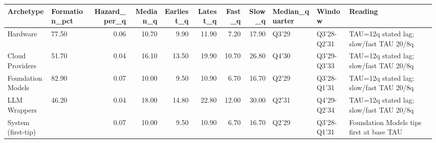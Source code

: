\begin{tabular}{llrrrrrrlll}
\toprule
Archetype & Formation_pct & Hazard_per_q & Median_q & Earliest_q & Latest_q & Fast_q & Slow_q & Median_quarter & Window & Reading \\
\midrule
Hardware & 77.50 & 0.06 & 10.70 & 9.90 & 11.90 & 7.20 & 17.90 & Q3'29 & Q3'28-Q2'31 & TAU=12q stated lag; slow/fast TAU 20/8q \\
Cloud Providers & 51.70 & 0.04 & 16.10 & 13.50 & 19.90 & 10.70 & 26.80 & Q4'30 & Q3'29-Q3'33 & TAU=12q stated lag; slow/fast TAU 20/8q \\
Foundation Models & 82.90 & 0.07 & 10.00 & 9.50 & 10.90 & 6.70 & 16.70 & Q2'29 & Q3'28-Q1'31 & TAU=12q stated lag; slow/fast TAU 20/8q \\
LLM Wrappers & 46.20 & 0.04 & 18.00 & 14.80 & 22.80 & 12.00 & 30.00 & Q2'31 & Q4'29-Q2'34 & TAU=12q stated lag; slow/fast TAU 20/8q \\
System (first-tip) &  & 0.07 & 10.00 & 9.50 & 10.90 & 6.70 & 16.70 & Q2'29 & Q3'28-Q1'31 & Foundation Models tips first at base TAU \\
\bottomrule
\end{tabular}
